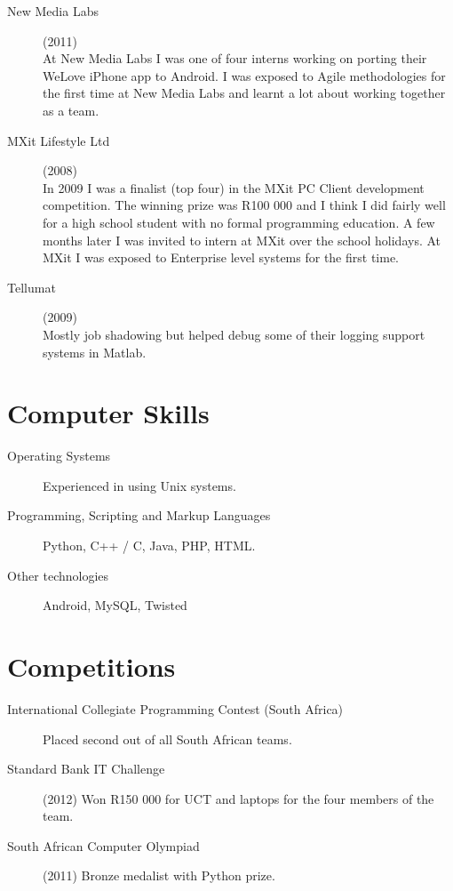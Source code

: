 \documentclass[margin,line,a4paper]{resume}
\begin{document}
\begin{resume}
\begin{description}
                \item[New Media Labs] (2011) \\
                    At New Media Labs I was one of four interns working on porting their WeLove iPhone app to Android.
                    I was exposed to Agile methodologies for the first time at New Media Labs and learnt a lot about
                    working together as a team.

                \item[MXit Lifestyle Ltd] (2008) \\
                    In 2009 I was a finalist (top four) in the MXit PC Client development competition. The winning prize was R100 000 and I think I did fairly well for a high school student with no formal programming education. A few months later I was invited to intern at MXit over the school holidays. At MXit I was exposed to Enterprise level systems for the first time.

                \item[Tellumat] (2009) \\
                    Mostly job shadowing but helped debug some of their logging support systems
                in Matlab.

            \end{description}

        \section{\mysidestyle Computer Skills}
            \begin{description}
                \item [Operating Systems] Experienced in using Unix systems.

                \item [Programming, Scripting and Markup Languages] Python, C++ / C, Java, PHP, HTML.

                \item [Other technologies] Android, MySQL, Twisted
            \end{description}

        \section{\mysidestyle Competitions}
            \begin{description}
                \item [International Collegiate Programming Contest (South Africa)] Placed second out of all South African teams.
                \item [Standard Bank IT Challenge] (2012) Won R150 000 for UCT and laptops for the
                    four members of the team.
                \item [South African Computer Olympiad] (2011) Bronze medalist with Python prize.


\end{description}
\end{resume}
\end{document}
